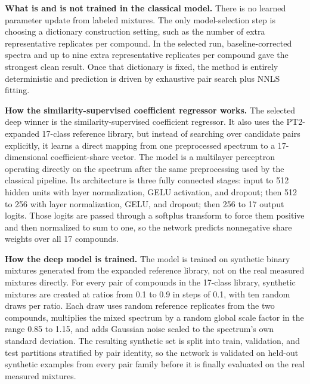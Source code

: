 \documentclass[11pt]{article}
\begin{document}
\textbf{What is and is not trained in the classical model.} There is no learned parameter update from labeled mixtures. The only model-selection step is choosing a dictionary construction setting, such as the number of extra representative replicates per compound. In the selected run, baseline-corrected spectra and up to nine extra representative replicates per compound gave the strongest clean result. Once that dictionary is fixed, the method is entirely deterministic and prediction is driven by exhaustive pair search plus NNLS fitting.

\textbf{How the similarity-supervised coefficient regressor works.} The selected deep winner is the similarity-supervised coefficient regressor. It also uses the PT2-expanded 17-class reference library, but instead of searching over candidate pairs explicitly, it learns a direct mapping from one preprocessed spectrum to a 17-dimensional coefficient-share vector. The model is a multilayer perceptron operating directly on the spectrum after the same preprocessing used by the classical pipeline. Its architecture is three fully connected stages: input to 512 hidden units with layer normalization, GELU activation, and dropout; then 512 to 256 with layer normalization, GELU, and dropout; then 256 to 17 output logits. Those logits are passed through a softplus transform to force them positive and then normalized to sum to one, so the network predicts nonnegative share weights over all 17 compounds.

\textbf{How the deep model is trained.} The model is trained on synthetic binary mixtures generated from the expanded reference library, not on the real measured mixtures directly. For every pair of compounds in the 17-class library, synthetic mixtures are created at ratios from 0.1 to 0.9 in steps of 0.1, with ten random draws per ratio. Each draw uses random reference replicates from the two compounds, multiplies the mixed spectrum by a random global scale factor in the range 0.85 to 1.15, and adds Gaussian noise scaled to the spectrum's own standard deviation. The resulting synthetic set is split into train, validation, and test partitions stratified by pair identity, so the network is validated on held-out synthetic examples from every pair family before it is finally evaluated on the real measured mixtures.
\end{document}

